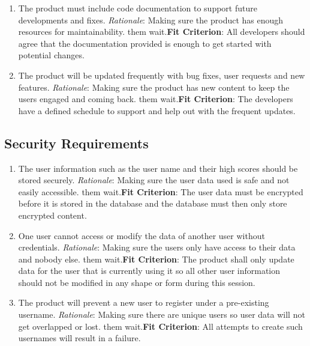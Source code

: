 \documentclass[12pt, titlepage]{article}
\begin{document}
\begin{enumerate}[{NFR5}.1]
	\item  The product must include code documentation to support future developments and fixes. 
	\newline \emph{Rationale}:  Making sure the product has enough resources for maintainability.
	them wait.\newline \textbf{Fit Criterion}: All developers should agree that the documentation provided is enough to get started with potential changes.
	
	\item The product will be updated frequently with bug fixes, user requests and new features. 
	\newline \emph{Rationale}:  Making sure the product has new content to keep the users engaged and coming back.
	them wait.\newline \textbf{Fit Criterion}: The developers have a defined schedule to support and help out with the frequent updates.
\end{enumerate}

\subsection{Security Requirements}

\begin{enumerate}[{NFR6}.1]
	\item  The user information such as the user name and their high scores should be stored securely. 
	\newline \emph{Rationale}: Making sure the user data used is safe and not easily accessible.
	them wait.\newline \textbf{Fit Criterion}: The user data must be encrypted before it is stored in the database and the database must then only store encrypted content.
	
	\item One user cannot access or modify the data of another user without credentials. 
	\newline \emph{Rationale}: Making sure the users only have access to their data and nobody else.
	them wait.\newline \textbf{Fit Criterion}: The product shall only update data for the user that is currently using it so all other user information should not be modified in any shape or form during this session.
	
	\item The product will prevent a new user to register under a pre-existing username. 
	\newline \emph{Rationale}: Making sure there are unique users so user data will not get overlapped or lost.
	them wait.\newline \textbf{Fit Criterion}: All attempts to create such usernames will result in a failure.
\end{enumerate}
\end{document}
